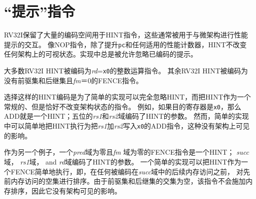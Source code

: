 \section{“提示”指令}
\label{sec:rv32i-hints}

RV32I保留了大量的编码空间用于HINT指令，这些通常被用于与微架构进行性能提示的交互。
像NOP指令，除了提升{\tt pc}和任何适用的性能计数器，HINT不改变任何架构上的可视状态。实现中总是被允许忽略已编码的提示。

大多数RV32I HINT被编码为{\em rd}={\tt x0}的整数运算指令。
其余RV32I HINT被编码为没有前驱集和后继集且{\em fm}＝0的FENCE指令。

\begin{commentary}
选择这样的HINT编码是为了简单的实现可以完全忽略HINT，而把HINT作为一个常规的、但是恰好不改变架构状态的指令。
例如，如果目的寄存器是{\tt x0}，那么ADD就是一个HINT；五位的{\em rs1}和{\em rs2}域编码了HINT的参数。
然而，简单的实现中可以简单地把HINT执行为把{\em rs1}加{\em rs2}写入{\tt x0}的ADD指令，这种没有架构上可见的影响。

作为另一个例子，一个{\em pred}域为零且{\em fm} 域为零的FENCE指令是一个HINT；
{\em succ}域， {\em rs1}域， and {\em rd}域编码了HINT的参数。
一个简单的实现可以把HINT作为一个FENCE简单地执行，即，在任何被编码在{\em succ}域中的后续内存访问之前，
对先前内存访问的空集进行排序。由于前驱集和后继集的交集为空，该指令不会施加内存排序，因此它没有架构可见的影响。
\end{commentary}

